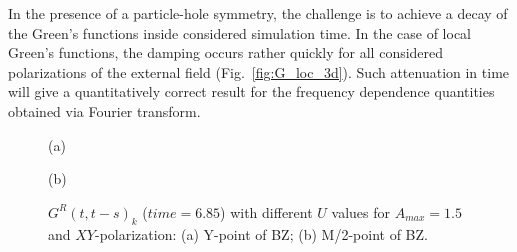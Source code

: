 In the presence of a particle-hole symmetry, the challenge is to achieve a decay of the Green's functions inside considered simulation time.
In the case of local Green's functions, the damping occurs rather quickly for all considered polarizations of the external field (Fig.~\ref{fig:G_loc_3d}). Such attenuation in time will give a quantitatively correct result for the frequency dependence quantities obtained via Fourier transform. 
\begin{figure}[h!]
\begin{minipage}[h]{0.5\linewidth}
 (a) \\
\end{minipage}
\hfill
\begin{minipage}[h]{0.5\linewidth}
 (b) \\
\end{minipage}
\caption{$G^{R}(t,t-s)_k$ ($time=6.85$) with different $U$ values for $A_{max}=1.5$ and $XY$-polarization: (a) Y-point of BZ; (b) M/2-point of BZ.}
\label{fig:G_k_res_ret_u_dep}
\end{figure}

